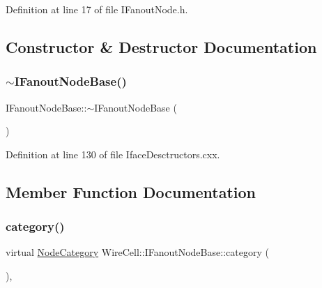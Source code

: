 Definition at line 17 of file I\+Fanout\+Node.\+h.



\subsection{Constructor \& Destructor Documentation}
\mbox{\label{class_wire_cell_1_1_i_fanout_node_base_a2f3f4b680932e70f5a04146d06a781ef}} 
\subsubsection{\texorpdfstring{$\sim$\+I\+Fanout\+Node\+Base()}{~IFanoutNodeBase()}}
{\footnotesize\ttfamily I\+Fanout\+Node\+Base\+::$\sim$\+I\+Fanout\+Node\+Base (\begin{DoxyParamCaption}{ }\end{DoxyParamCaption})\hspace{0.3cm}{\ttfamily [virtual]}}



Definition at line 130 of file Iface\+Desctructors.\+cxx.



\subsection{Member Function Documentation}
\mbox{\label{class_wire_cell_1_1_i_fanout_node_base_a9532dcaebc70f1ecdfaf3526c32f8c40}} 
\subsubsection{\texorpdfstring{category()}{category()}}
{\footnotesize\ttfamily virtual \hyperlink{class_wire_cell_1_1_i_node_a5546e64cbb70bd3ac787295cac9ac803}{Node\+Category} Wire\+Cell\+::\+I\+Fanout\+Node\+Base\+::category (\begin{DoxyParamCaption}{ }\end{DoxyParamCaption})\hspace{0.3cm}{\ttfamily [inline]}, {\ttfamily [virtual]}}



